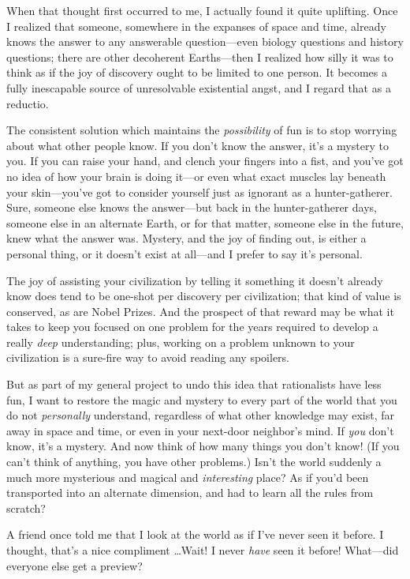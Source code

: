 {
 When that thought first occurred to me, I actually found it quite
uplifting. Once I realized that someone, somewhere in the expanses of
space and time, already knows the answer to any answerable
question---even biology questions and history questions; there are
other decoherent Earths---then I realized how silly it was to think as
if the joy of discovery ought to be limited to one person. It becomes a
fully inescapable source of unresolvable existential angst, and I
regard that as a reductio.}

{
 The consistent solution which maintains the \textit{possibility}
of fun is to stop worrying about what other people know. If you
don't know the answer, it's a mystery
to you. If you can raise your hand, and clench your fingers into a
fist, and you've got no idea of how your brain is doing
it---or even what exact muscles lay beneath your
skin---you've got to consider yourself just as ignorant
as a hunter-gatherer. Sure, someone else knows the answer---but back in
the hunter-gatherer days, someone else in an alternate Earth, or for
that matter, someone else in the future, knew what the answer was.
Mystery, and the joy of finding out, is either a personal thing, or it
doesn't exist at all---and I prefer to say
it's personal.}

{
 The joy of assisting your civilization by telling it something it
doesn't already know does tend to be one-shot per
discovery per civilization; that kind of value is conserved, as are
Nobel Prizes. And the prospect of that reward may be what it takes to
keep you focused on one problem for the years required to develop a
really \textit{deep} understanding; plus, working on a problem unknown
to your civilization is a sure-fire way to avoid reading any spoilers.}

{
 But as part of my general project to undo this idea that
rationalists have less fun, I want to restore the magic and mystery to
every part of the world that you do not \textit{personally} understand,
regardless of what other knowledge may exist, far away in space and
time, or even in your next-door neighbor's mind. If
\textit{you} don't know, it's a
mystery. And now think of how many things you don't
know! (If you can't think of anything, you have other
problems.) Isn't the world suddenly a much more
mysterious and magical and \textit{interesting} place? As if
you'd been transported into an alternate dimension, and
had to learn all the rules from scratch?}

{
 A friend once told me that I look at the world as if
I've never seen it before. I thought,
that's a nice compliment \ldots Wait! I never
\textit{have} seen it before! What---did everyone else get a preview?}

